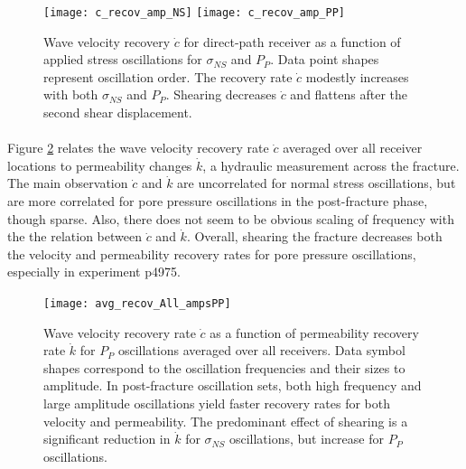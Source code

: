 \documentclass[letterpaper,10pt]{article}
\begin{document}
	\clearpage
	
	\begin{figure}[ht]
		\centering
		\texttt{[image: c\_recov\_amp\_NS]}
		\texttt{[image: c\_recov\_amp\_PP]}
		\caption{Wave velocity recovery $ \dot c $ for direct-path receiver as a function of applied stress oscillations for $ \sigma_{NS} $ and $ P_P $. Data point shapes represent oscillation order. The recovery rate $ \dot c $ modestly increases with both $ \sigma_{NS} $ and $ P_P $. Shearing decreases $ \dot c $ and flattens after the second shear displacement. }
		\label{fig:c_recov}
	\end{figure}
	
	\clearpage
	
	\paragraph{}
	Figure \ref{fig:avg_recov_plots} relates the wave velocity recovery rate $ \dot c $ averaged over all receiver locations to permeability changes $ \dot k $, a hydraulic measurement across the fracture. The main observation $ \dot c $ and $ \dot k $ are uncorrelated for normal stress oscillations, but are more correlated for pore pressure oscillations in the post-fracture phase, though sparse. Also, there does not seem to be obvious scaling of frequency with the the relation between 
	$ \dot c $ and $ \dot k $. Overall, shearing the fracture decreases both the velocity and permeability recovery rates for pore pressure oscillations, especially in experiment p4975. 
	
	\clearpage
	
	\begin{figure}[ht]
		\centering
		\texttt{[image: avg\_recov\_All\_ampsPP]}
		\caption{Wave velocity recovery rate $ \dot c $ as a function of permeability recovery rate $ \dot k$ for $ P_P $ oscillations averaged over all receivers. Data symbol shapes correspond to the oscillation frequencies and their sizes to amplitude. In post-fracture oscillation sets, both high frequency and large amplitude oscillations yield faster recovery rates for both velocity and permeability. The predominant effect of shearing is a significant reduction in $ \dot k $ for $ \sigma_{NS} $ oscillations, but increase for  $ P_P $ oscillations.}
		\label{fig:avg_recov_plots}
	\end{figure}
	
	\clearpage
	
\end{document}
